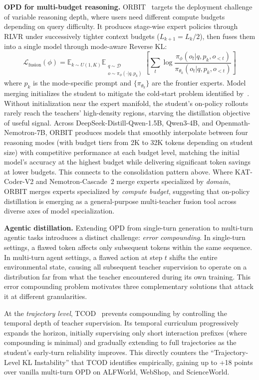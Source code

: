 \documentclass{article} %
\newcommand{\E}{\mathbb{E}}
\newcommand{\loss}{\mathcal{L}}
\begin{document}
\textbf{OPD for multi-budget reasoning.} ORBIT~\citep{2601.08310} targets the deployment challenge of variable reasoning depth, where users need different compute budgets depending on query difficulty. It produces stage-wise expert policies through RLVR under successively tighter context budgets ($L_{k+1} = L_k/2$), then fuses them into a single model through mode-aware Reverse KL:
\begin{equation}
    \loss_{\text{fusion}}(\phi) = \E_{k \sim U(1,K)} \E_{\substack{q \sim \mathcal{D} \\ o \sim \pi_\phi(\cdot|q, p_k)}} \left[ \sum_t \log \frac{\pi_\phi(o_t | q, p_k, o_{<t})}{\pi_{\theta_k}(o_t | q, p_k, o_{<t})} \right]
\end{equation}
where $p_k$ is the mode-specific prompt and $\{\pi_{\theta_k}\}$ are the frontier experts. Model merging initializes the student to mitigate the cold-start problem identified by~\citet{2601.07155}. Without initialization near the expert manifold, the student's on-policy rollouts rarely reach the teachers' high-density regions, starving the distillation objective of useful signal. Across DeepSeek-Distill-Qwen-1.5B, Qwen3-4B, and Openmath-Nemotron-7B, ORBIT produces models that smoothly interpolate between four reasoning modes (with budget tiers from 2K to 32K tokens depending on student size) with competitive performance at each budget level, matching the initial model's accuracy at the highest budget while delivering significant token savings at lower budgets. This connects to the consolidation pattern above. Where KAT-Coder-V2 and Nemotron-Cascade~2 merge experts specialized by \emph{domain}, ORBIT merges experts specialized by \emph{compute budget}, suggesting that on-policy distillation is emerging as a general-purpose multi-teacher fusion tool across diverse axes of model specialization.

\textbf{Agentic distillation.} Extending OPD from single-turn generation to multi-turn agentic tasks introduces a distinct challenge: \emph{error compounding}. In single-turn settings, a flawed token affects only subsequent tokens within the same sequence. In multi-turn agent settings, a flawed action at step $t$ shifts the entire environmental state, causing all subsequent teacher supervision to operate on a distribution far from what the teacher encountered during its own training. This error compounding problem motivates three complementary solutions that attack it at different granularities.

At the \emph{trajectory level}, TCOD~\citep{2604.24005} prevents compounding by controlling the temporal depth of teacher supervision. Its temporal curriculum progressively expands the horizon, initially supervising only short interaction prefixes (where compounding is minimal) and gradually extending to full trajectories as the student's early-turn reliability improves. This directly counters the ``Trajectory-Level KL Instability'' that TCOD identifies empirically, gaining up to +18 points over vanilla multi-turn OPD on ALFWorld, WebShop, and ScienceWorld.
\end{document}

